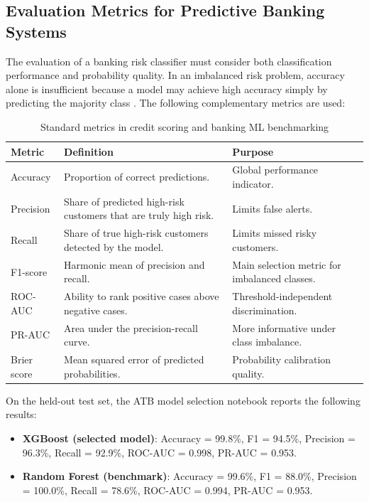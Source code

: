 \subsection{Evaluation Metrics for Predictive Banking Systems}

The evaluation of a banking risk classifier must consider both classification performance
and probability quality. In an imbalanced risk problem, accuracy alone is insufficient
because a model may achieve high accuracy simply by predicting the majority class
\cite{lessmann2015}. The following complementary metrics are used:

\begin{table}[H]
\centering
\caption{Evaluation metrics for the ATB customer risk classifier}
\label{tab:atb_ml_metrics}
\begin{tabular}{|p{3cm}|p{5.5cm}|p{4.2cm}|}
\hline
\rowcolor{blue!15}
\textbf{Metric} & \textbf{Definition} & \textbf{Purpose} \\
\hline
Accuracy & Proportion of correct predictions. & Global performance indicator. \\
\hline
Precision & Share of predicted high-risk customers that are truly high risk. &
Limits false alerts. \\
\hline
Recall & Share of true high-risk customers detected by the model. &
Limits missed risky customers. \\
\hline
F1-score & Harmonic mean of precision and recall. &
Main selection metric for imbalanced classes. \\
\hline
ROC-AUC & Ability to rank positive cases above negative cases. &
Threshold-independent discrimination. \\
\hline
PR-AUC & Area under the precision-recall curve. &
More informative under class imbalance. \\
\hline
Brier score & Mean squared error of predicted probabilities. &
Probability calibration quality. \\
\hline
\end{tabular}
\caption*{\small Standard metrics in credit scoring and banking ML benchmarking
\cite{lessmann2015, hand1997}}
\end{table}

On the held-out test set, the ATB model selection notebook reports the following results:

\begin{itemize}
    \item \textbf{XGBoost (selected model)}: Accuracy = 99.8\%, F1 = 94.5\%,
    Precision = 96.3\%, Recall = 92.9\%, ROC-AUC = 0.998, PR-AUC = 0.953.
    \item \textbf{Random Forest (benchmark)}: Accuracy = 99.6\%, F1 = 88.0\%,
    Precision = 100.0\%, Recall = 78.6\%, ROC-AUC = 0.994, PR-AUC = 0.953.
\end{itemize}

